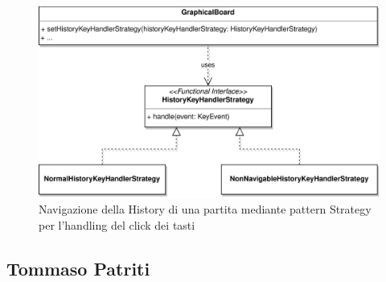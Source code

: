 \documentclass[a4paper,12pt]{report}
\begin{document}
\begin{figure}[H]
    \begin{center}
        \centering
        \includegraphics[width=\textwidth]{img/Alessandro/history_key_strategy.png}
    \end{center}
    \caption{Navigazione della History di una partita mediante pattern Strategy per l'handling del click dei tasti}
    \label{img:history_key_strategy}
\end{figure}

\clearpage
\subsection{Tommaso Patriti}
\end{document}

